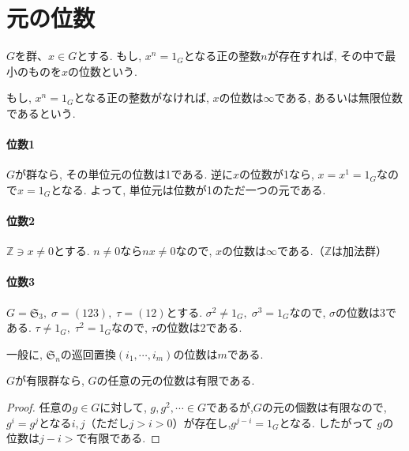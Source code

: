 \section*{元の位数}

\begin{dfn*}
	$G$を群、$x \in G$とする. もし, $x^n=1_G$となる正の整数$n$が存在すれば,
	その中で最小のものを$x$の位数という.

	もし, $x^n = 1_G$となる正の整数がなければ, 
	$x$の位数は$\infty$である, あるいは無限位数であるという.
\end{dfn*}

\paragraph*{位数1}
$G$が群なら, その単位元の位数は1である.
逆に$x$の位数が1なら, $x=x^1=1_G$なので$x=1_G$となる.
よって, 単位元は位数が1のただ一つの元である.\newline

\paragraph*{位数2}
$\mathbb{Z}\owns x \neq 0$とする. $n\neq 0$なら$nx \neq 0$なので,
$x$の位数は$\infty$である.（$\mathbb{Z}$は加法群）\newline

\paragraph*{位数3}
$G = \mathfrak{S}_3, \; \sigma=(1 2 3),\; \tau=(1 2)$とする.
$ \sigma^2 \neq 1_G, \; \sigma^3=1_G $なので, $\sigma$の位数は3である.
$\tau \neq 1_G, \; \tau^2=1_G $なので, $\tau$の位数は2である.

一般に, $\mathfrak{S}_n$の巡回置換$(i_1, \cdots, i_m)$の位数は$m$である.\newline

\begin{tcolorbox}
	\begin{prp*}
		$G$が有限群なら, $G$の任意の元の位数は有限である.
	\end{prp*}
\end{tcolorbox}
\begin{proof}
  任意の$g\in G$に対して, $g, g^2,\cdots \in G$であるが,$G$の元の個数は有限なので, 
  $g^i = g^j$となる$i,j$（ただし$j>i>0$）が存在し,$g^{j-i}=1_G$となる.
  したがって $g$の位数は$j-i>$で有限である.
\end{proof}

